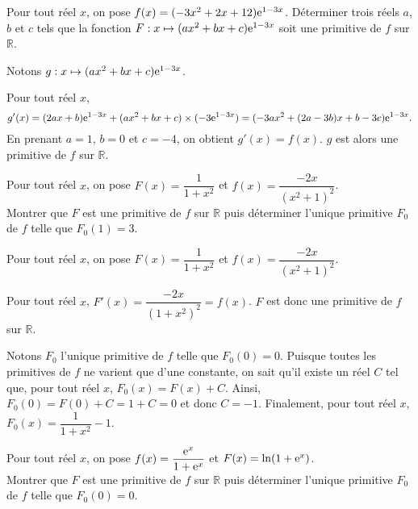 \documentclass[11pt,fleqn, openany]{book} %
\begin{document}
  


\begin{exercise}Pour tout réel $x$, on pose $f(x)=(-3x^2+2x+12)\mathrm{e}^{1-3x}$. Déterminer trois réels $a$, $b$ et $c$ tels que la fonction $F : x\mapsto (ax^2+bx+c)\mathrm{e}^{1-3x}$ soit une primitive de $f$ sur $\mathbb{R}$.\end{exercise}


\begin{solution}

Notons \(g:x\mapsto (ax^2+bx+c)\mathrm{e}^{1-3x}\). 

Pour tout réel \(x\), 
\[g'(x)=(2ax+b)\mathrm{e}^{1-3x}+(ax^2+bx+c)\times (-3\mathrm{e}^{1-3x})=(-3ax^2+(2a-3b)x+b-3c)\mathrm{e}^{1-3x}.\]
En prenant \(a=1\), \(b=0\) et \(c=-4\), on obtient \(g'(x)=f(x)\). \(g\) est alors une primitive de \(f\) sur \(\mathbb{R}\).

 \end{solution}
 
 


\begin{exercise}Pour tout réel $x$, on pose $F(x)=\dfrac{1}{1+x^2}$ et $f(x)=\dfrac{-2x}{(x^2+1)^2}$. \\
Montrer que $F$ est une primitive de $f$ sur $\mathbb{R}$ puis déterminer l'unique primitive $F_0$ de $f$ telle que $F_0(1)=3$.\end{exercise}

\begin{solution}

Pour tout réel \(x\), on pose \(F(x)=\dfrac{1}{1+x^2}\) et \(f(x)=\dfrac{-2x}{(x^2+1)^2}\). 

Pour tout réel \(x\), \(F'(x)=\dfrac{-2x}{(1+x^2)^2}=f(x)\). \(F\) est donc une primitive de \(f\) sur \(\mathbb{R}\).

Notons \(F_0\) l'unique primitive de \(f\) telle que \(F_0(0)=0\). Puisque toutes les primitives de \(f\) ne varient que d'une constante, on sait qu'il existe un réel \(C\) tel que, pour tout réel \(x\), \(F_0(x)=F(x)+C\).
Ainsi, \(F_0(0)=F(0)+C=1+C=0\) et donc \(C=-1\). Finalement, pour tout réel \(x\), \(F_0(x)=\dfrac{1}{1+x^2}-1\).

\end{solution}




\begin{exercise}Pour tout réel $x$, on pose $f(x)=\dfrac{\mathrm{e}^x}{1+\mathrm{e}^x}$ et $F(x)=\ln(1+\mathrm{e}^x)$.\\
 Montrer que $F$ est une primitive de $f$ sur $\mathbb{R}$ puis déterminer l'unique primitive $F_0$ de $f$ telle que $F_0(0)=0$.
\end{exercise}
\end{document}
